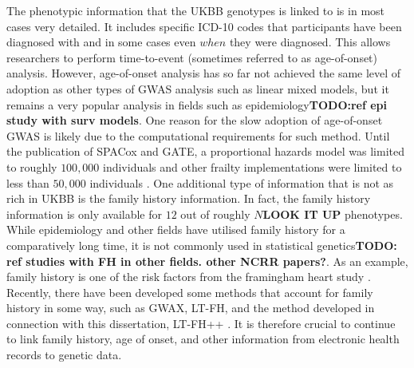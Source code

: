 
The phenotypic information that the UKBB genotypes is linked to is in most cases very detailed. It includes specific ICD-10 codes 
that participants have been diagnosed with and in some cases even $ when $ they were diagnosed. This allows researchers to perform 
time-to-event (sometimes referred to as age-of-onset) analysis. However, age-of-onset analysis has so far not achieved the same level 
of adoption as other types of GWAS analysis such as linear mixed models, but it remains a very popular analysis in fields such as 
epidemiology\textbf{TODO:ref epi study with surv models}. One reason for the slow adoption of age-of-onset GWAS is likely due to the  
computational requirements for such method. Until the publication of SPACox\cite{bi2020fast} and GATE\cite{dey2022efficient}, a 
proportional hazards model was limited to roughly $ 100,000 $ individuals and other frailty implementations were limited to less than 
$ 50,000 $ individuals \cite{rizvi2019gwasurvivr,syed2017survivalgwas_sv,he2020fast}. One additional type of information that is not 
as rich in UKBB is the family history information. In fact, the family history information is only available for $ 12 $ out of roughly 
$ N $\textbf{LOOK IT UP} phenotypes. While epidemiology and other fields have utilised family history for a comparatively long time, 
it is not commonly used in statistical genetics\textbf{TODO: ref studies with FH in other fields. other NCRR papers?}. As an example, 
family history is one of the risk factors from the framingham heart study \cite{splansky2007third,kannel1990contribution}. Recently, 
there have been developed some methods that account for family history in some way, such as GWAX, LT-FH, and the method developed in 
connection with this dissertation, LT-FH++ \cite{gwax,hujoel2020liability,pedersen2022accounting}. It is therefore 
crucial to continue to link family history, age of onset, and other information from electronic health records to genetic data. 


